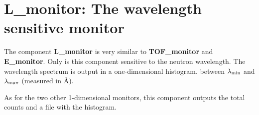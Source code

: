 

\section{L\_monitor: The wavelength sensitive monitor}
\label{s:L_monitor}



The component {\bf L\_monitor} is very similar to
{\bf TOF\_monitor} and {\bf E\_monitor}.
Only is this component sensitive to the neutron wavelength.
The wavelength spectrum is output in a one-dimensional histogram.
between $\lambda_{\rm min}$ and $\lambda_{\rm max}$ (measured in \AA ).

As for the two other 1-dimensional monitors, this component outputs
the total counts and a file with the histogram.

